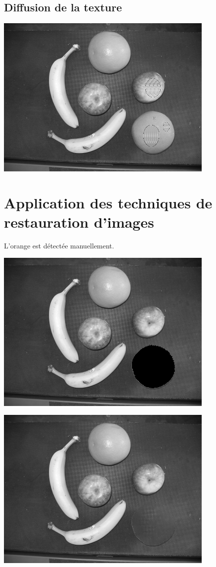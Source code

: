 \documentclass[a4paper,11pt]{article}
\begin{document}
\subsection{Diffusion de la texture}
\begin{center}
\includegraphics[scale=0.7]{fruitTexture.png}
\end{center}

\newpage
\section{Application des techniques de restauration d'images}
L'orange est détectée manuellement.
\begin{center}
\includegraphics[scale=0.7]{fruit1_boir.png}
\end{center}

\begin{center}
\includegraphics[scale=0.7]{fruit1_photo.png}
\end{center}
\end{document}
